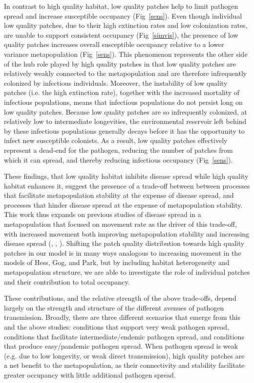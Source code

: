 \documentclass{svjour3}
\begin{document}
In contrast to high quality habitat, low quality patches help to limit pathogen spread and increase susceptible occupancy (Fig~\ref{sens}). Even though individual low quality patches, due to their high extinction rates and low colonization rates, are unable to support consistent occupancy (Fig~\ref{simvis}), the presence of low quality patches increases overall susceptible occupancy relative to a lower variance metapopulation (Fig~\ref{sens}).  This phenomenon represents the other side of the hub role played by high quality patches in that low quality patches are relatively weakly connected to the metapopulation and are therefore infrequently colonized by infectious individuals.  Moreover, the instability of low quality patches (i.e. the high extinction rate), together with the increased mortality of infectious populations, means that infectious populations do not persist long on low quality patches.  Because low quality patches are so infrequently colonized, at relatively low to intermediate longevities, the environmental reservoir left behind by these infectious populations generally decays before it has the opportunity to infect new susceptible colonists.  As a result, low quality patches effectively represent a dead-end for the pathogen, reducing the number of patches from which it can spread, and thereby reducing infectious occupancy (Fig~\ref{sens}). 

These findings, that low quality habitat inhibits disease spread while high quality habitat enhances it, suggest the presence of a trade-off between between processes that facilitate metapopulation stability at the expense of disease spread, and processes that hinder disease spread at the expense of metapopulation stability.  This work thus expands on previous studies of disease spread in a metapopulation that focused on movement rate as the driver of this trade-off, with increased movement both improving metapopulation stability and increasing disease spread (\cite{Hess1996}, \cite{Gog2002}, \cite{Park2012}).  Shifting the patch quality distribution towards high quality patches in our model is in many ways analogous to increasing movement in the models of Hess, Gog, and Park, but by including habitat heterogeneity and metapopulation structure, we are able to investigate the role of individual patches and their contribution to total occupancy.

These contributions, and the relative strength of the above trade-offs, depend largely on the strength and structure of the different avenues of pathogen transmission.  Broadly, there are three different scenarios that emerge from this and the above studies: conditions that support very weak pathogen spread, conditions that facilitate intermediate/endemic pathogen spread, and conditions that produce easy/pandemic pathogen spread.  When pathogen spread is weak (e.g. due to low longevity, or weak direct transmission), high quality patches are a net benefit to the metapopulation, as their connectivity and stability facilitate greater occupancy with little additional pathogen spread.  
\end{document}
